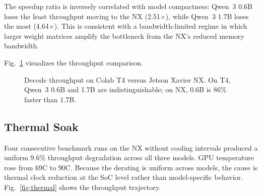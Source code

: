 \documentclass[conference]{IEEEtran}
\begin{document}
The speedup ratio is inversely correlated with model compactness: Qwen~3 0.6B loses the least throughput moving to the NX (2.51$\times$), while Qwen~3 1.7B loses the most (4.64$\times$). This is consistent with a bandwidth-limited regime in which larger weight matrices amplify the bottleneck from the NX's reduced memory bandwidth.

Fig.~\ref{fig:throughput} visualizes the throughput comparison.

\begin{figure}[t]
\centering
{}
\caption{Decode throughput on Colab T4 versus Jetson Xavier NX. On T4, Qwen~3 0.6B and 1.7B are indistinguishable; on NX, 0.6B is 86\% faster than 1.7B.}
\label{fig:throughput}
\end{figure}

\subsection{Thermal Soak}
Four consecutive benchmark runs on the NX without cooling intervals produced a uniform 9.6\% throughput degradation across all three models. GPU temperature rose from 69\textdegree C to 90\textdegree C. Because the derating is uniform across models, the cause is thermal clock reduction at the SoC level rather than model-specific behavior. Fig.~\ref{fig:thermal} shows the throughput trajectory.
\end{document}
